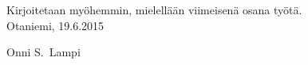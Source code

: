 \documentclass[finnish,12pt,a4paper,pdftex,elec,utf8]{aaltothesis}
\begin{document}
\newpage
%
%
%



Kirjoitetaan myöhemmin, mielellään viimeisenä osana työtä.\\

\vspace{5cm}
Otaniemi, 19.6.2015

\vspace{5mm}
{\hfill Onni S.\ Lampi \hspace{1cm}}
\end{document}
